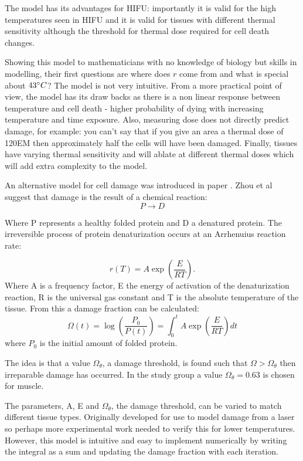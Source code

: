 \documentclass[11pt]{article} %
\begin{document}
	The model has its advantages for HIFU: importantly it is valid for the high temperatures seen in HIFU and it is valid for tissues with different thermal sensitivity although the threshold for thermal dose required for cell death changes. 
	
	Showing this model to mathematicians with no knowledge of biology but skills in modelling, their first questions are where does $ r $ come from and what is special about $43 \degree C $? The model is not very intuitive. From a more practical point of view, the model has its draw backs as there is a non linear response between temperature and cell death - higher probability of dying with increasing temperature and time exposure. Also, measuring dose does not directly predict damage, for example: you can't say that if you give an area a thermal dose of 120EM then approximately half the cells will have been damaged. Finally, tissues have varying thermal sensitivity and will ablate at different thermal doses which will add extra complexity to the model.
	
		An alternative model for cell damage was introduced in  paper  \cite{Zhou2007}. Zhou et al suggest that damage is the result of a chemical reaction:
		\begin{equation}
		P\rightarrow D
		\end{equation}
		
		Where P represents a healthy folded protein and D a denatured protein. The irreversible process of protein denaturization occurs at an Arrhenuius reaction rate:
		
		\begin{equation}
			\boxed{r(T)=A\exp\left( \frac{E}{RT}\right) }.
		\end{equation}	
		Where A is a frequency factor, E the energy of activation of the denaturization reaction, R is the universal gas constant and T is the absolute temperature of the tissue. From this a damage fraction can be calculated:
		\begin{equation}
			\boxed{\Omega(t)=\log\left( \frac{P_0}{P(t)}\right) =\int_{0}^{t}A\exp\left( \frac{E}{RT}\right) dt}
		\end{equation}
		where $ P_0$ is the initial amount of folded protein.
		
		The idea is that a value $\Omega_\theta$, a damage threshold, is found such that $\Omega>\Omega_\theta$ then irreparable damage has occurred. In the study group a value $\Omega_\theta=0.63$ is chosen for muscle. 
		
		
	 	The parameters, A, E and $\Omega_\theta$, the damage threshold, can be varied to match different tissue types. Originally developed for use to model damage from a laser so perhaps more experimental work needed to verify this for lower temperatures. However, this model is intuitive and easy to implement numerically by writing the integral as a sum and updating the damage fraction with each iteration. 
	 	
\end{document}
